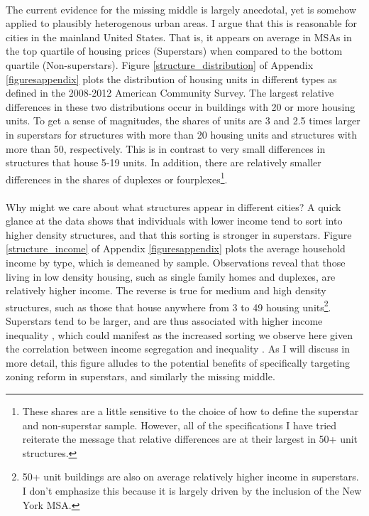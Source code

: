 \documentclass[]{article}
\theoremstyle{plain}
\begin{document}
\paragraph*{}
The current evidence for the missing middle is largely anecdotal, yet is somehow applied to plausibly heterogenous urban areas. I argue that this is reasonable for cities in the mainland United States. That is, it appears on average in MSAs in the top quartile of housing prices (Superstars) when compared to the bottom quartile (Non-superstars). Figure \ref{structure_distribution} of Appendix \ref{figuresappendix} plots the distribution of housing units in different types as defined in the 2008-2012 American Community Survey. The largest relative differences in these two distributions occur in buildings with 20 or more housing units. To get a sense of magnitudes, the shares of units are 3 and 2.5 times larger in superstars for structures with more than 20 housing units and structures with more than 50, respectively. This is in contrast to very small differences in structures that house 5-19 units. In addition, there are relatively smaller differences in the shares of duplexes or fourplexes\footnote{These shares are a little sensitive to the choice of how to define the superstar and non-superstar sample. However, all of the specifications I have tried reiterate the message that relative differences are at their largest in 50+ unit structures.}.  

\paragraph*{}
Why might we care about what structures appear in different cities? A quick glance at the data shows that individuals with lower income tend to sort into higher density structures, and that this sorting is stronger in superstars.  Figure \ref{structure_income} of Appendix \ref{figuresappendix} plots the average household income by type, which is demeaned by sample. Observations reveal that those living in low density housing, such as single family homes and duplexes, are relatively higher income. The reverse is true for medium and high density structures, such as those that house anywhere from 3 to 49 housing units\footnote{50+ unit buildings are also on average relatively higher income in superstars. I don't emphasize this because it is largely driven by the inclusion of the New York MSA.}. Superstars tend to be larger, and are thus associated with higher income inequality \citep{ineqcitysize} \citep{spatialsorting}, which could manifest as the increased sorting we observe here given the correlation between income segregation and inequality \citep{FogliGuerrieri}. As I will discuss in more detail, this figure alludes to the potential benefits of specifically targeting zoning reform in superstars, and similarly the missing middle.
\end{document}
